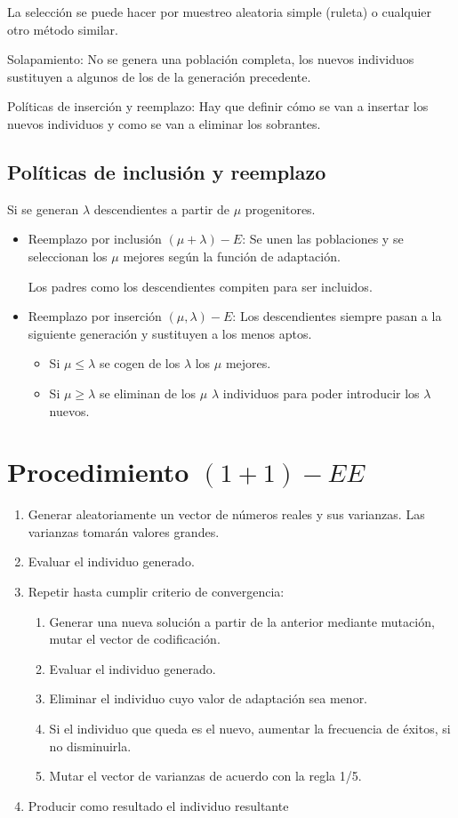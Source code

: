 \documentclass[12pt, twoside, openright]{report} %
\begin{document}
La selección se puede hacer por muestreo aleatoria simple (ruleta) o cualquier otro método similar.

Solapamiento: No se genera una población completa, los nuevos individuos sustituyen a algunos de los de la generación precedente.

Políticas de inserción y reemplazo: Hay que definir cómo se van a insertar los nuevos individuos y como se van a eliminar los sobrantes.

\subsection{Políticas de inclusión y reemplazo}
Si se generan $\lambda$ descendientes a partir de $\mu$ progenitores.
\begin{itemize}
	\item Reemplazo por inclusión $(\mu + \lambda)-E$: Se unen las poblaciones y se seleccionan los $\mu$ mejores según la función de adaptación.
	
	Los padres como los descendientes compiten para ser incluidos.
	\item Reemplazo por inserción $(\mu, \lambda)-E$: Los descendientes siempre pasan a la siguiente generación y sustituyen a los menos aptos.
	\begin{itemize}
		\item Si $\mu \leq \lambda$ se cogen de los $\lambda$ los $\mu$ mejores.
		\item Si $\mu \geq \lambda$ se eliminan de los $\mu$ $\lambda$ individuos para poder introducir los $\lambda$ nuevos.
	\end{itemize}
\end{itemize}

\section{Procedimiento $(1+1)-EE$}
\begin{enumerate}
	\item Generar aleatoriamente un vector de números reales y sus varianzas. Las varianzas tomarán valores grandes.
	\item Evaluar el individuo generado.
	\item Repetir hasta cumplir criterio de convergencia:
	\begin{enumerate}
		\item Generar una nueva solución a partir de la anterior mediante mutación, mutar el vector de codificación.
		\item Evaluar el individuo generado.
		\item Eliminar el individuo cuyo valor de adaptación sea menor.
		\item Si el individuo que queda es el nuevo, aumentar la frecuencia de éxitos, si no disminuirla.
		\item Mutar el vector de varianzas de acuerdo con la regla 1/5.
	\end{enumerate}
	
	\item Producir como resultado el individuo resultante
\end{enumerate}
\end{document}
